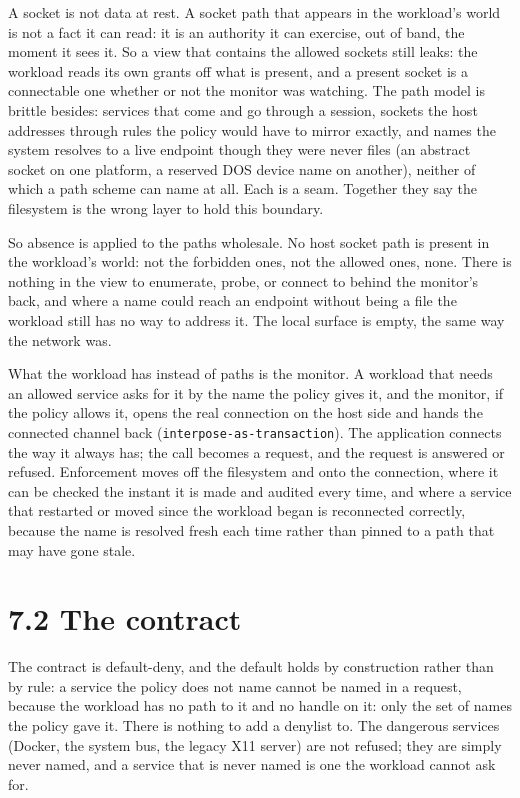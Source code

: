 A socket is not data at rest. A socket path that appears in the
workload's world is not a fact it can read: it is an authority it can
exercise, out of band, the moment it sees it. So a view that contains
the allowed sockets still leaks: the workload reads its own grants off
what is present, and a present socket is a connectable one whether or
not the monitor was watching. The path model is brittle besides:
services that come and go through a session, sockets the host addresses
through rules the policy would have to mirror exactly, and names the
system resolves to a live endpoint though they were never files (an
abstract socket on one platform, a reserved DOS device name on another),
neither of which a path scheme can name at all. Each is a seam. Together
they say the filesystem is the wrong layer to hold this boundary.

So absence is applied to the paths wholesale. No host socket path is
present in the workload's world: not the forbidden ones, not the allowed
ones, none. There is nothing in the view to enumerate, probe, or connect
to behind the monitor's back, and where a name could reach an endpoint
without being a file the workload still has no way to address it. The
local surface is empty, the same way the network was.

What the workload has instead of paths is the monitor. A workload that
needs an allowed service asks for it by the name the policy gives it,
and the monitor, if the policy allows it, opens the real connection on
the host side and hands the connected channel back
(\texttt{interpose-as-transaction}). The application connects the way it
always has; the call becomes a request, and the request is answered or
refused. Enforcement moves off the filesystem and onto the connection,
where it can be checked the instant it is made and audited every time,
and where a service that restarted or moved since the workload began is
reconnected correctly, because the name is resolved fresh each time
rather than pinned to a path that may have gone stale.

\hypertarget{the-contract}{%
\section{7.2 The contract}\label{the-contract}}

The contract is default-deny, and the default holds by construction
rather than by rule: a service the policy does not name cannot be named
in a request, because the workload has no path to it and no handle on
it: only the set of names the policy gave it. There is nothing to add a
denylist to. The dangerous services (Docker, the system bus, the legacy
X11 server) are not refused; they are simply never named, and a service
that is never named is one the workload cannot ask for.

